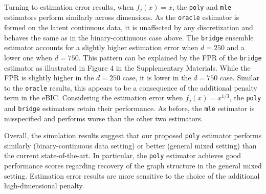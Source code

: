 Turning to estimation error results, when \(f_j(x) = x\), the \texttt{poly} and \texttt{mle} estimators perform similarly across dimensions. As the \texttt{oracle} estimator is formed on the latent continuous data, it is unaffected by any discretization and behaves the same as in the binary-continuous case above. The \texttt{bridge} ensemble estimator accounts for a slightly higher estimation error when \(d = 250\) and a lower one when \(d=750\). This pattern can be explained by the FPR of the \texttt{bridge} estimator as illustrated in Figure 4 in the Supplementary Materials. While the FPR is slightly higher in the \(d=250\) case, it is lower in the \(d=750\) case. Similar to the \texttt{oracle} results, this appears to be a consequence of the additional penalty term in the eBIC. Considering the estimation error when \(f_j(x) = x^{1/3}\), the \texttt{poly} and \texttt{bridge} estimators retain their performance. As before, the \texttt{mle} estimator is misspecified and performs worse than the other two estimators.

Overall, the simulation results suggest that our proposed \texttt{poly} estimator performs similarly (binary-continuous data setting) or better (general mixed setting) than the current state-of-the-art. In particular, the \texttt{poly} estimator achieves good performance scores regarding recovery of the graph structure in the general mixed setting. Estimation error results are more sensitive to the choice of the additional high-dimensional penalty.
